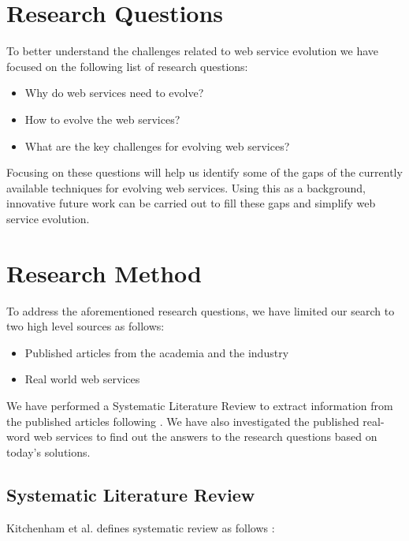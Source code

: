 \documentclass[runningheads,a4paper]{llncs}
\begin{document}
\section{Research Questions} %
\label{sec:research_questions}
To better understand the challenges related to web service evolution we have focused on the following list of research questions:

\begin{itemize}
  \item Why do web services need to evolve?
  \item How to evolve the web services?
  \item What are the key challenges for evolving web services?
\end{itemize}

Focusing on these questions will help us identify some of the gaps of the currently available techniques for evolving web services. Using this as a background, innovative future work can be carried out to fill these gaps and simplify web service evolution.

\section{Research Method} %
\label{sec:research_method}

To address the aforementioned research questions, we have limited our search to two high level sources as follows:

\begin{itemize}
  \item Published articles from the academia and the industry
  \item Real world web services
\end{itemize}

We have performed a Systematic Literature Review to extract information from the published articles following \cite{kitchenham2007guidelines}. We have also investigated the published real-word web services to find out the answers to the research questions based on today’s solutions.

\subsection{Systematic Literature Review} %
\label{sub:systematic_literature_review}
Kitchenham et al. defines systematic review as follows \cite{kitchenham2007guidelines}:
\end{document}
